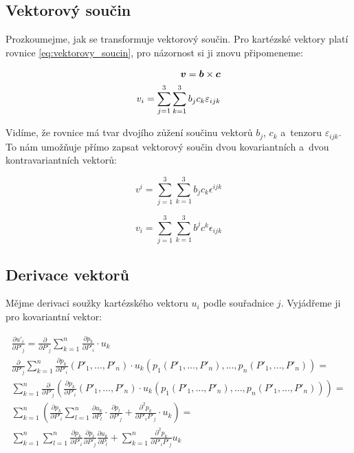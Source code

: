 \subsection{Vektorový součin}

Prozkoumejme, jak se transformuje vektorový součin. Pro kartézské vektory platí rovnice \eqref{eq:vektorovy_soucin}, pro názornost si ji znovu připomeneme:

\begin{equation}
\begin{split}
\boldsymbol{v} = \boldsymbol{b} \times \boldsymbol{c} \\
v_i = \sum_{j=1}^3 \sum_{k=1}^3 b_j c_k \varepsilon_{ijk}
\end{split}
\end{equation}

Vidíme, že rovnice má tvar dvojího zůžení součinu vektorů \(b_j\), \(c_k\) a~tenzoru \(\varepsilon_{ijk}\). To nám umožňuje přímo zapsat vektorový součin dvou kovariantních a~dvou kontravariantních vektorů:

\begin{equation}
v^i = \sum_{j=1}^3 \sum_{k=1}^3 b_j c_k \epsilon^{ijk}
\end{equation}

\begin{equation}
v_i = \sum_{j=1}^3 \sum_{k=1}^3 b^j c^k \epsilon_{ijk}
\end{equation}

\subsection{Derivace vektorů}

Mějme derivaci soužky kartézského vektoru \(u_i\) podle souřadnice \(j\). Vyjádřeme ji pro kovariantní vektor:

\begin{equation}
\label{eq:derivace_vektoru}
\begin{split}
\frac{\partial u'_i}{\partial P'_j} = \frac{\partial}{\partial P'_j} \sum_{k=1}^n \frac{\partial p_k}{\partial P'_i} \cdot u_k \\
\frac{\partial}{\partial P'_j} \sum_{k=1}^n \frac{\partial p_k}{\partial P'_i}(P'_1, ..., P'_n) \cdot u_k(p_1(P'_1, ..., P'_n), ..., p_n(P'_1, ..., P'_n)) = \\
\sum_{k=1}^n \frac{\partial}{\partial P'_j} \left( \frac{\partial p_k}{\partial P'_i}(P'_1, ..., P'_n) \cdot u_k(p_1(P'_1, ..., P'_n), ..., p_n(P'_1, ..., P'_n)) \right) = \\
\sum_{k=1}^n \left(\frac{\partial p_k}{\partial P'_i} \sum_{l=1}^n \frac{\partial u_k}{\partial P_l} \cdot \frac{\partial p_l}{\partial P'_j} + \frac{\partial^2 p_k}{\partial P'_i P'_j} \cdot u_k \right) = \\
\sum_{k=1}^n \sum_{l=1}^n \frac{\partial p_k}{\partial P'_i} \frac{\partial p_l}{\partial P'_j} \frac{\partial u_k}{\partial P_l} + \sum_{k=1}^n \frac{\partial^2 p_k}{\partial P'_i P'_j} u_k
\end{split} 
\end{equation}

